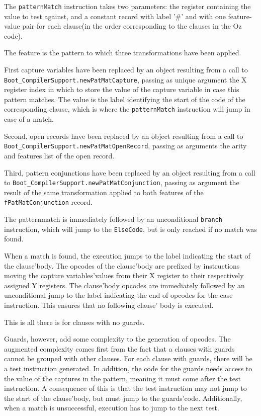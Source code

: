 \documentclass[a4paper]{memoir}
\begin{document}
The \lstinline!patternMatch! instruction takes two parameters: the register containing the
value to test against, and a constant record with label '\#' and with one
feature-value pair for each clause(in the order corresponding to the clauses in the Oz code). 

The feature is the pattern to which three transformations have been applied. 

First capture variables have been replaced by an object resulting from a call to
\lstinline!Boot_CompilerSupport.newPatMatCapture!, passing as unique argument
the X register index in which to store the value of the capture variable in
case this pattern matches. The value is the label identifying the start of the
code of the corresponding clause, which is where the \lstinline!patternMatch! instruction
will jump in case of a match.

Second, open records have been replaced by an object resulting from a
call to \lstinline!Boot_CompilerSupport.newPatMatOpenRecord!, passing as
arguments the arity and features list of the open record.

Third, pattern conjunctions have been replaced by an object resulting from a call 
to \lstinline!Boot_CompilerSupport.newPatMatConjunction!, passing as argument the result
of the same transformation applied to both features of the \lstinline!fPatMatConjunction! record.

The patternmatch is immediately followed by an unconditional \lstinline!branch! instruction,
which will jump to the \lstinline!ElseCode!, but is only reached if no match was found.

When a match is found, the execution jumps to the label indicating the start of the clause'body.
The opcodes of the clause'body are prefixed by instructions moving the capture
variables'values from their X register to their respectively assigned Y
registers.
The clause'body opcodes are immediately followed by an unconditional jump to
the label indicating the end of opcodes for the case instruction. This ensures
that no following clause' body is executed.

This is all there is for clauses with no guards. 

Guards, however, add some complexity to the generation of opcodes.
The augmented complexity comes first from the fact that a clauses with guards cannot
be grouped with other clauses. For each clause with guards, there will be a
test instruction generated. In addition, the code for the guards needs access
to the value of the captures in the pattern, meaning it must come after the
test instruction. A consequence of this is that the test instruction may not jump to the start
of the clause'body, but must jump to the guards'code. Additionally, when a match
is unsuccessful, execution has to jump to the next test.
\end{document}
